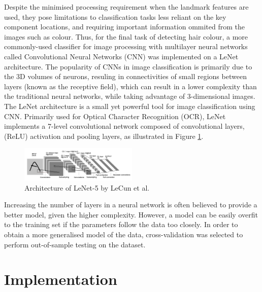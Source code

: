 \documentclass[conference]{IEEEtran}
\begin{document}
Despite the minimised processing requirement when the landmark features are used, they pose limitations to classification tasks less reliant on the key component locations, and requiring important information ommited from the images such as colour. Thus, for the final task of detecting hair colour, a more commonly-used classifier for image processing with multilayer neural networks called Convolutional Neural Networks (CNN) was implemented on a LeNet architecture. The popularity of CNNs in image classification is primarily due to the 3D volumes of neurons, resuling in connectivities of small regions between layers (known as the receptive field), which can result in a lower complexity than the traditional neural networks, while taking advantage of 3-dimensional images. 
The LeNet architecture is a small yet powerful tool for image classification using CNN. Primarily used for Optical Character Recognition (OCR), LeNet implements a 7-level convolutional network composed of convolutional layers, (ReLU) activation and pooling layers, as illustrated in Figure \ref{fig: LeNet}.

\begin{figure} [h] %
  \centering
    \includegraphics[width=0.5\textwidth]{graphs/LeNet} 
    \caption{Architecture of LeNet-5 by LeCun et al. \cite{LeCun}}
    \label{fig: LeNet}
\end{figure}

Increasing the number of layers in a neural network is often believed to provide a better model, given the higher complexity. However, a model can be easily overfit to the training set if the parameters follow the data too closely.
In order to obtain a more generalised model of the data, cross-validation was selected to perform out-of-sample testing on the dataset.

\section{Implementation} \label{s-implement}

\end{document}

